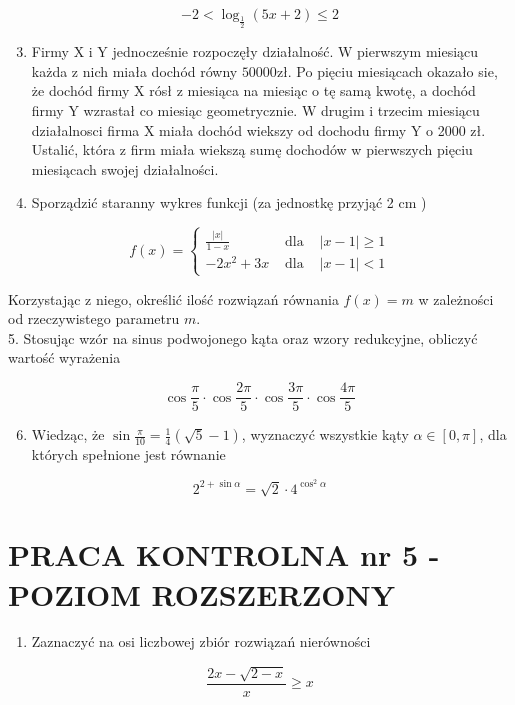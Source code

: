 \documentclass[10pt]{article}
\begin{document}
$$
-2<\log _{\frac{1}{2}}(5 x+2) \leqslant 2
$$

\begin{enumerate}
  \setcounter{enumi}{2}
  \item Firmy X i Y jednocześnie rozpoczęły działalność. W pierwszym miesiącu każda z nich miała dochód równy $50000 \mathrm{zł}$. Po pięciu miesiącach okazało sie, że dochód firmy X rósł z miesiąca na miesiąc o tę samą kwotę, a dochód firmy Y wzrastał co miesiąc geometrycznie. W drugim i trzecim miesiącu działalnosci firma X miała dochód wiekszy od dochodu firmy Y o 2000 zł. Ustalić, która z firm miała wiekszą sumę dochodów w pierwszych pięciu miesiącach swojej działalności.
  \item Sporządzić staranny wykres funkcji (za jednostkę przyjąć 2 cm )
\end{enumerate}

$$
f(x)=\left\{\begin{array}{lll}
\frac{|x|}{1-x} & \text { dla } & |x-1| \geqslant 1 \\
-2 x^{2}+3 x & \text { dla } & |x-1|<1
\end{array}\right.
$$

Korzystając z niego, określić ilość rozwiązań równania $f(x)=m$ w zależności od rzeczywistego parametru $m$.\\
5. Stosując wzór na sinus podwojonego kąta oraz wzory redukcyjne, obliczyć wartość wyrażenia

$$
\cos \frac{\pi}{5} \cdot \cos \frac{2 \pi}{5} \cdot \cos \frac{3 \pi}{5} \cdot \cos \frac{4 \pi}{5}
$$

\begin{enumerate}
  \setcounter{enumi}{5}
  \item Wiedząc, że $\sin \frac{\pi}{10}=\frac{1}{4}(\sqrt{5}-1)$, wyznaczyć wszystkie kąty $\alpha \in[0, \pi]$, dla których spełnione jest równanie
\end{enumerate}

$$
2^{2+\sin \alpha}=\sqrt{2} \cdot 4^{\cos ^{2} \alpha}
$$

\section*{PRACA KONTROLNA nr 5 - POZIOM ROZSZERZONY}
\begin{enumerate}
  \item Zaznaczyć na osi liczbowej zbiór rozwiązań nierówności
\end{enumerate}

$$
\frac{2 x-\sqrt{2-x}}{x} \geqslant x
$$
\end{document}

